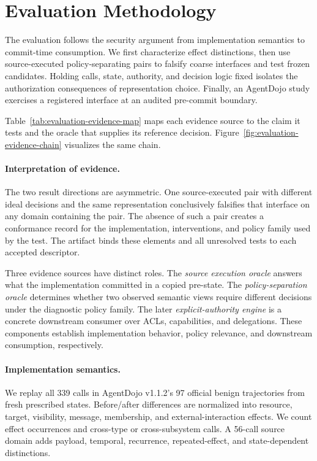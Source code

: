 \section{Evaluation Methodology}
\label{sec:evaluation}

The evaluation follows the security argument from implementation semantics to
commit-time consumption. We first characterize effect distinctions, then use
source-executed policy-separating pairs to falsify coarse interfaces and test
frozen candidates. Holding calls, state, authority, and decision logic fixed
isolates the authorization consequences of representation choice. Finally, an
AgentDojo study exercises a registered interface at an audited pre-commit
boundary.


Table~\ref{tab:evaluation-evidence-map} maps each evidence source to the claim
it tests and the oracle that supplies its reference decision.
Figure~\ref{fig:evaluation-evidence-chain} visualizes the same chain.



\paragraph{Interpretation of evidence.}
The two result directions are asymmetric. One source-executed pair with
different ideal decisions and the same representation conclusively falsifies
that interface on any domain containing the pair. The absence of such a pair
creates a conformance record for the implementation, interventions, and policy
family used by the test. The artifact binds these elements and all
unresolved tests to each accepted descriptor.

Three evidence sources have distinct roles. The \emph{source execution oracle}
answers what the implementation committed in a copied pre-state. The
\emph{policy-separation oracle} determines whether two observed semantic views
require different decisions under the diagnostic policy family. The later
\emph{explicit-authority engine} is a concrete downstream consumer over ACLs,
capabilities, and delegations. These components establish implementation
behavior, policy relevance, and downstream consumption, respectively.

\paragraph{Implementation semantics.}
We replay all 339 calls in AgentDojo v1.1.2's 97 official benign trajectories
from fresh prescribed states. Before/after differences are normalized into
resource, target, visibility, message, membership, and external-interaction
effects. We count effect occurrences and cross-type or cross-subsystem calls. A
56-call source domain adds payload, temporal, recurrence, repeated-effect, and
state-dependent distinctions.

